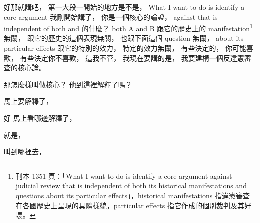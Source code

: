 \hypertarget{w06:cue:262}{}好那就講吧，
\hypertarget{w06:cue:263}{}第一大段一開始的地方是不是，
\hypertarget{w06:cue:264}{}What I want to do is identify a core argument
\hypertarget{w06:cue:265}{}我剛開始講了，
\hypertarget{w06:cue:266}{}你是一個核心的論證，
\hypertarget{w06:cue:267}{}against that is independent of both
\hypertarget{w06:cue:268}{}and 的什麼？
\hypertarget{w06:cue:269}{}both A and B
\hypertarget{w06:cue:270}{}跟它的歷史上的 manifestation\footnote{刊本 1351 頁：「What I want to do is identify a core argument against judicial review that is independent of both its historical manifestations and questions about its particular effects」，historical manifestations 指違憲審查在各國歷史上呈現的具體樣貌，particular effects 指它作成的個別裁判及其好壞。} 無關，
\hypertarget{w06:cue:271}{}跟它的歷史的這個表現無關，
\hypertarget{w06:cue:272}{}也跟下面這個 question 無關，
\hypertarget{w06:cue:273}{}about its particular effects
\hypertarget{w06:cue:274}{}跟它的特別的效力，
\hypertarget{w06:cue:275}{}特定的效力無關，
\hypertarget{w06:cue:276}{}有些決定的，
\hypertarget{w06:cue:277}{}你可能喜歡，
\hypertarget{w06:cue:278}{}有些決定你不喜歡，
\hypertarget{w06:cue:279}{}這我不管，
\hypertarget{w06:cue:280}{}我現在要講的是，
\hypertarget{w06:cue:281}{}我要建構一個反違憲審查的核心論。

\hypertarget{w06:cue:282}{}那怎麼樣叫做核心？
\hypertarget{w06:cue:283}{}他到這裡解釋了嗎？

\hypertarget{w06:cue:284}{}馬上要解釋了，

\hypertarget{w06:cue:285}{}好 馬上看哪邊解釋了，

\hypertarget{w06:cue:286}{}就是，

\hypertarget{w06:cue:287}{}叫到哪裡去，

